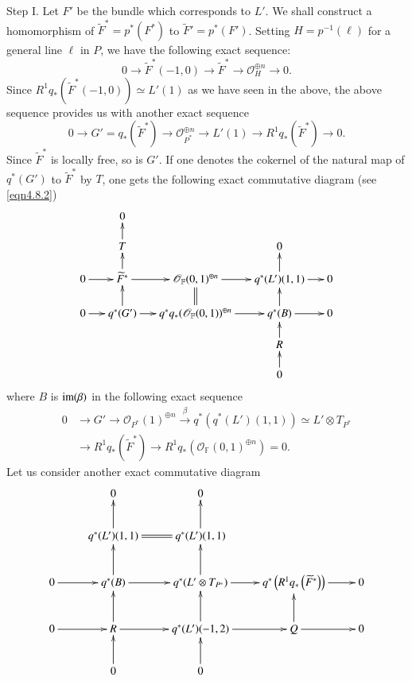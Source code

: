 \begin{Proof}
Step I. Let $F'$ be the bundle which corresponds to $L'$. We shall
construct a homomorphism of $\widetilde{F}^{\ast}=p^{\ast}(F^{\ast})$
to $\widetilde{F}'=p^{\ast}(F')$. Setting $H=p^{-1}(\ell)$ for a
general line $\ell$ in $P$, we have the following exact sequence: 
$$
0\to \widetilde{F}^{\ast}(-1,0)\to \widetilde{F}^{\ast}\to
\mathscr{O}^{\oplus n}_H\to 0.
$$ 
Since $R^{1}q_{\ast}\left(\widetilde{F}^{\ast}(-1,0)\right)\simeq
L'(1)$ as we have seen in the above, the above sequence provides us
with another exact sequence 
$$
0\to G'= q_{\ast}\left(\widetilde{F}^{\ast}\right)\to \mathscr{O}^{\oplus
  n}_{P^{\ast}}\to L'(1)\to
R^{1}q_{\ast}\left(\widetilde{F}^{\ast}\right)\to 0.
$$
Since $\widetilde{F}^{\ast}$ is locally free, so is $G'$. If one
denotes the cokernel of the natural map of $q^{\ast}(G')$ to
$\widetilde{F}^{\ast}$ by $T$, one gets the following exact commutative
  diagram (see \ref{eqn4.8.2})
\begin{equation}\label{eqn4.8.3}
\vcenter{
\xymatrix@=.5cm{&0&&&\\
&T\ar[u]&&0&\\
0\ar[r]& \widetilde{F}^{\ast}\ar[u]\ar[r]&
  \mathscr{O}_{\mathbb{F}}(0,1)^{\oplus
    n}\ar[r]&q^{\ast}(L')(1,1)\ar[u]\ar[r]&0\\
0\ar[r]&
q^{\ast}(G')\ar[u]\ar[r]&q^{\ast}q_{\ast}(\mathscr{O}_{\mathbb{F}}(0,1))^{\oplus
n}\ar@{=}[u]\ar[r]& q^{\ast}(B)\ar[u]\ar[r]&0\\
&&&R\ar[u]&\\
&&&0\ar[u]&}}
\end{equation}\pageoriginale
where $B$ is $\mathrm{im}(\beta)$ in the following exact sequence 
\begin{align*}
0 &\to G'\to \mathscr{O}_{P^{\ast}}(1)^{\oplus
  n}\xrightarrow{\beta}q^{\ast}(q^{\ast}(L')(1,1))\simeq L'\otimes
T_{P^{\ast}}\\
& \to R^{1}q_{\ast}\left(\widetilde{F}^{\ast}\right)\to
R^{1}q_{\ast}(\mathscr{O}_{\mathbb{F}}(0,1)^{\oplus n})=0.
\end{align*}
Let us consider another exact commutative diagram 
$$
\xymatrix{&0&0&&\\
&q^{\ast}(L')(1,1)\ar[u]\ar@{=}[r]& q^{\ast}(L')(1,1)\ar[u]& &\\
0\ar[r]&q^{\ast}(B)\ar[u]\ar[r]&q^{\ast}(L'\otimes
T_{P^{\ast}})\ar[u]\ar[r]&q^{\ast}\left(R^{1}q_{\ast}\left(\widetilde{F}^{\ast}\right)\right)\ar[r]&0\\
0\ar[r]&R\ar[u]\ar[r]&q^{\ast}(L')(-1,2)\ar[u]\ar[r]&Q\ar[u]\ar[r]&0\\
&0\ar[u]&0\ar[u]&&}
$$
\end{Proof}
